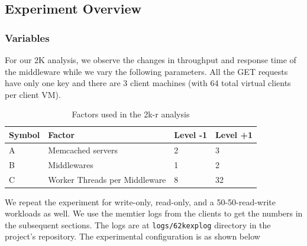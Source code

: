 \documentclass[11pt,a4paper]{article}
\begin{document}
\subsection{Experiment Overview}

\subsubsection{Variables}
For our 2K analysis, we observe the changes in throughput and response time of the middleware while we vary the following parameters.  All the GET requests have only one key and there are 3 client machines (with 64 total virtual clients per client VM).

\begin{table}[h]
	\centering
	\caption{Factors used in the 2k-r analysis}
	\label{my-label}
	\begin{tabular}{|l|l|l|l|}
		\hline
		\textbf{Symbol} & \textbf{Factor} & \textbf{Level -1} & \textbf{Level +1} \\ \hline
		A      & Memcached servers             & 2        & 3        \\ \hline
		B      & Middlewares                   & 1        & 2        \\ \hline
		C      & Worker Threads per Middleware & 8        & 32       \\ \hline
	\end{tabular}
\end{table}

We repeat the experiment for write-only, read-only, and a 50-50-read-write workloads as well. 
We use the memtier logs from the clients to get the numbers in the subsequent sections.  The logs are at \texttt{logs/6\textunderscore 2k\textunderscore exp\textunderscore log} directory in the project's repository. The experimental configuration is as shown below
\end{document}
